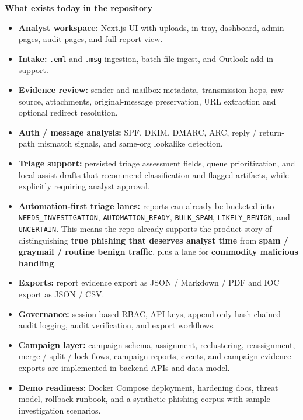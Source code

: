 \documentclass[10pt,a4paper]{article}
\begin{document}
\noindent\textbf{What exists today in the repository}
\begin{itemize}
  \item \textbf{Analyst workspace:} Next.js UI with uploads, in-tray, dashboard, admin pages, audit pages, and full report view.
  \item \textbf{Intake:} \texttt{.eml} and \texttt{.msg} ingestion, batch file ingest, and Outlook add-in support.
  \item \textbf{Evidence review:} sender and mailbox metadata, transmission hops, raw source, attachments, original-message preservation, URL extraction and optional redirect resolution.
  \item \textbf{Auth / message analysis:} SPF, DKIM, DMARC, ARC, reply / return-path mismatch signals, and same-org lookalike detection.
  \item \textbf{Triage support:} persisted triage assessment fields, queue prioritization, and local assist drafts that recommend classification and flagged artifacts, while explicitly requiring analyst approval.
  \item \textbf{Automation-first triage lanes:} reports can already be bucketed into \texttt{NEEDS\_INVESTIGATION}, \texttt{AUTOMATION\_READY}, \texttt{BULK\_SPAM}, \texttt{LIKELY\_BENIGN}, and \texttt{UNCERTAIN}. This means the repo already supports the product story of distinguishing \textbf{true phishing that deserves analyst time} from \textbf{spam / graymail / routine benign traffic}, plus a lane for \textbf{commodity malicious handling}.
  \item \textbf{Exports:} report evidence export as JSON / Markdown / PDF and IOC export as JSON / CSV.
  \item \textbf{Governance:} session-based RBAC, API keys, append-only hash-chained audit logging, audit verification, and export workflows.
  \item \textbf{Campaign layer:} campaign schema, assignment, reclustering, reassignment, merge / split / lock flows, campaign reports, events, and campaign evidence exports are implemented in backend APIs and data model.
  \item \textbf{Demo readiness:} Docker Compose deployment, hardening docs, threat model, rollback runbook, and a synthetic phishing corpus with sample investigation scenarios.
\end{itemize}
\end{document}
